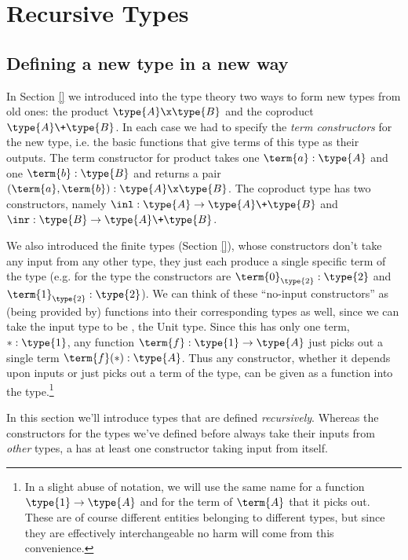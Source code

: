 \section{Recursive Types}
\label{sec:DataTypes}

\subsection{Defining a new type in a new way}
\label{sec:NaturalNumbers-NewTypeNewWay}

In Section \ref{} we introduced into the type theory two ways to form new types from old ones: the product 
$\type{A} \x \type{B}$ and the coproduct
$\type{A} \+ \type{B}$.
In each case we had to specify the \emph{term constructors} for the new type, i.e. the basic functions that give terms of this type as their outputs.  The term constructor for product takes one $\term{a}:\type{A}$ and one $\term{b}:\type{B}$ and returns a pair 
$(\term{a}, \term{b}):\type{A} \x \type{B}$.  The coproduct type has two constructors, namely $\inl: \type{A} \to \type{A} \+ \type{B}$ and  
$\inr: \type{B} \to \type{A} \+ \type{B}$.

We also introduced the finite types (Section \ref{}), whose constructors don't take any input from any other type, they just each produce a single specific term of the type (e.g. for the type  the constructors are $\term{0}_{\type{2}}:\type{2}$ and $\term{1}_{\type{2}}:\type{2}$).  We can think of these ``no-input constructors'' as (being provided by) functions into their corresponding types as well, since we can take the input type to be , the Unit type.  Since this has only one term, $\ast:\type{1}$, any function $\term{f}: \type{1} \to \type{A}$ just picks out a single term $\term{f}(\ast):\type{A}$.  Thus any constructor, whether it depends upon inputs or just picks out a term of the type, can be given as a function into the type.\footnote{
In a slight abuse of notation, we will use the same name for a function $\type{1} \to \type{A}$ and for the term of $\term{A}$ that it picks out.  These are of course different entities belonging to different types, but since they are effectively interchangeable no harm will come from this convenience.
}

In this section we'll introduce types that are defined \emph{recursively}.  Whereas the constructors for the types we've defined before always take their inputs from \emph{other} types, a  
 has at least one constructor taking input from  itself.


